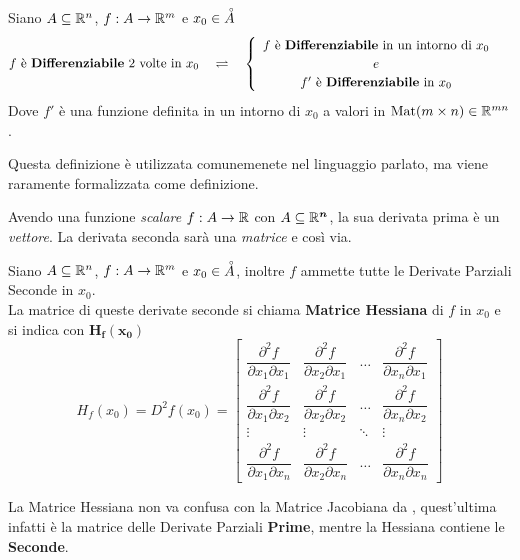 \begin{definition}
	\label{def:differenz_second}
	Siano $A \subseteq \mathbb{R}^n$, $f:A \to \mathbb{R}^m$ e $x_0 \in \accentset{\circ}{A}$
	\[
		f \text{ è \textbf{Differenziabile} } 2 \text{ volte in } x_0
		\quad \rightleftharpoons \quad
		\begin{cases}
			\begin{array}{c}
				f \text{ è \textbf{Differenziabile} in un intorno di } x_0\\
				e\\
				f' \text{ è \textbf{Differenziabile} in } x_0
			\end{array}
		\end{cases}
	\]
	Dove $f'$ è una funzione definita in un intorno di $x_0$ a valori in $\operatorname{Mat}(m \times n) \in \mathbb{R}^{mn}$.
	\begin{note}
		Questa definizione è utilizzata comunemenete nel linguaggio parlato, ma viene raramente formalizzata come definizione.
	\end{note}
	\begin{note}
		Avendo una funzione	\textit{scalare} $f: A \to \mathbb{R}$ con $A \subseteq \boldsymbol{\mathbb{R}^n}$, la sua derivata prima è un \textit{vettore}. La derivata seconda sarà una \textit{matrice} e così via.
	\end{note}
\end{definition}

\begin{definition}
	\label{def:hessiana}
	Siano $A \subseteq \mathbb{R}^n$, $f:A \to \mathbb{R}^m$ e $x_0 \in \accentset{\circ}{A}$, inoltre $f$ ammette tutte le Derivate Parziali Seconde in $x_0$.\\
	La matrice di queste derivate seconde si chiama \textbf{Matrice Hessiana} di $f$ in $x_0$ e si indica con $\boldsymbol{H_f(x_0)}$
	\[
		H_f(x_0) = D^2f(x_0) =
		\begin{bmatrix}
			\dfrac{\partial^2 f}{\partial x_1 \partial x_1} & \dfrac{\partial^2 f}{\partial x_2 \partial x_1} & \dots & \dfrac{\partial^2 f}{\partial x_n \partial x_1}\\[3ex]
			\dfrac{\partial^2 f}{\partial x_1 \partial x_2} & \dfrac{\partial^2 f}{\partial x_2 \partial x_2} & \dots & \dfrac{\partial^2 f}{\partial x_n \partial x_2}\\[3ex]
			\vdots & \vdots & \ddots & \vdots\\[3ex]
			\dfrac{\partial^2 f}{\partial x_1 \partial x_n} & \dfrac{\partial^2 f}{\partial x_2 \partial x_n} & \dots & \dfrac{\partial^2 f}{\partial x_n \partial x_n}
		\end{bmatrix}
	\]
	\begin{note}
		La Matrice Hessiana non va confusa con la Matrice Jacobiana da , quest'ultima infatti è la matrice delle Derivate Parziali \textbf{Prime}, mentre la Hessiana contiene le \textbf{Seconde}.
	\end{note}
\end{definition}

